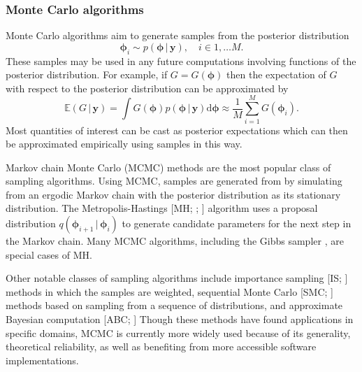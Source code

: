 \documentclass[a4paper, nobind]{templates/ociamthesis}
\begin{document}
\hypertarget{monte-carlo}{%
\subsubsection{Monte Carlo algorithms}\label{monte-carlo}}

Monte Carlo algorithms \autocite{robert2005monte} aim to generate samples from the posterior distribution
\begin{equation}
\boldsymbol{\mathbf{\phi}}_i \sim p(\boldsymbol{\mathbf{\phi}} \, | \, \mathbf{y}), \quad i \in 1, \ldots M.
\end{equation}
These samples may be used in any future computations involving functions of the posterior distribution.
For example, if \(G = G(\boldsymbol{\mathbf{\phi}})\) then the expectation of \(G\) with respect to the posterior distribution can be approximated by
\begin{equation}
\mathbb{E}(G \, | \, \mathbf{y}) = \int G(\boldsymbol{\mathbf{\phi}}) p(\boldsymbol{\mathbf{\phi}} \, | \, \mathbf{y}) \text{d} \boldsymbol{\mathbf{\phi}} \approx \frac{1}{M} \sum_{i = 1}^M G(\boldsymbol{\mathbf{\phi}}_i).
\end{equation}
Most quantities of interest can be cast as posterior expectations which can then be approximated empirically using samples in this way.

Markov chain Monte Carlo (MCMC) methods \autocite{roberts2004general} are the most popular class of sampling algorithms.
Using MCMC, samples are generated from by simulating from an ergodic Markov chain with the posterior distribution as its stationary distribution.
The Metropolis-Hastings {[}MH; \textcite{metropolis1953equation}; \textcite{hastings1970monte}{]} algorithm uses a proposal distribution \(q(\boldsymbol{\mathbf{\phi}}_{i + 1} \, | \, \boldsymbol{\mathbf{\phi}}_i)\) to generate candidate parameters for the next step in the Markov chain.
Many MCMC algorithms, including the Gibbs sampler \autocite{geman1984stochastic}, are special cases of MH.

Other notable classes of sampling algorithms include importance sampling {[}IS; \textcite{tokdar2010importance}{]} methods in which the samples are weighted, sequential Monte Carlo {[}SMC; \textcite{chopin2020introduction}{]} methods based on sampling from a sequence of distributions, and approximate Bayesian computation {[}ABC; \textcite{sisson2018handbook}{]}
Though these methods have found applications in specific domains, MCMC is currently more widely used because of its generality, theoretical reliability, as well as benefiting from more accessible software implementations.
\end{document}
